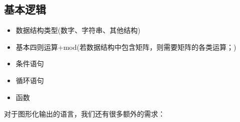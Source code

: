 \documentclass[11pt]{amsart}
\begin{document}
\subsection{基本逻辑}
\begin{itemize}
	\item 数据结构类型(数字、字符串、其他结构)
	\item 基本四则运算+mod(若数据结构中包含矩阵，则需要矩阵的各类运算；)
	\item 条件语句
	\item 循环语句
	\item 函数
\end{itemize}
对于图形化输出的语言，我们还有很多额外的需求：
\end{document}
